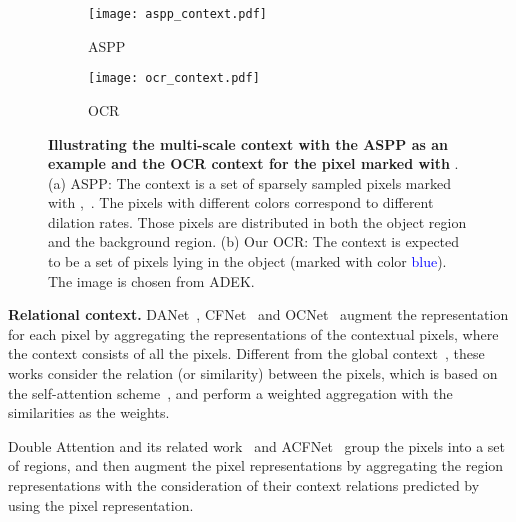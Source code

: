 \documentclass[runningheads]{llncs}
\begin{document}

\begin{figure}[t]
	\centering
	\begin{subfigure}[b]{0.32\textwidth}
		{\texttt{[image: aspp\_context.pdf]}}
		\caption{ASPP}
	\end{subfigure}
	\begin{subfigure}[b]{0.32\textwidth}
		{\texttt{[image: ocr\_context.pdf]}}
		\caption{OCR}
	\end{subfigure}
	\caption{
		\small{
		    \textbf{
			Illustrating the multi-scale context 
			with the ASPP as an example 
			and the OCR context
			for the pixel marked with} {}.
			(a) ASPP: 
			The context is a set of sparsely sampled pixels
			marked with {},~{}.
			The pixels with different colors correspond to 
			different dilation rates.
			Those pixels are distributed 
			in both the object region and the background region.
			(b) Our OCR:
			The context is expected to be
			a set of pixels lying in the object (marked with color \textcolor{blue}{blue}).
			The image is chosen from ADEK.
		}
	}
	\label{fig:context_compare}
\end{figure}

\noindent\textbf{Relational context.}
DANet~\cite{fu2018dual}, CFNet~\cite{zhang2019co} and OCNet~\cite{yuan2018ocnet,yuan2021}
augment the representation
for each pixel
by aggregating the representations
of the contextual pixels,
where the context consists of all the pixels.
Different from the global context~\cite{liu2015parsenet},
these works consider the relation (or similarity) between the pixels,
which is based on the self-attention scheme~\cite{wang2018non,vaswani2017attention},
and perform a weighted aggregation
with the similarities as the weights.

Double Attention 
and its related work~\cite{A2Net,Zhang_2019_ICCV,chen2018graph,NIPS2018_7456,li2018beyond,NIPS2018_7886,li19,huang2019interlaced}
and ACFNet~\cite{Zhang_2019_ICCV}
group the pixels into a set of regions,
and then augment the pixel representations
by aggregating the region representations
with the consideration of their context relations
predicted by using the pixel representation.
\end{document}
